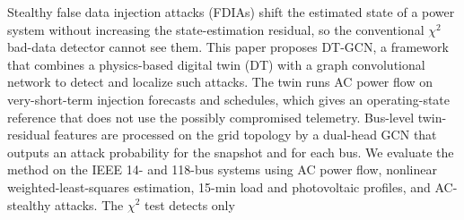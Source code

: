 Stealthy false data injection attacks (FDIAs) shift the estimated state of a power system without increasing the state-estimation residual, so the conventional $\chi^2$ bad-data detector cannot see them. This paper proposes DT-GCN, a framework that combines a physics-based digital twin (DT) with a graph convolutional network to detect and localize such attacks. The twin runs AC power flow on very-short-term injection forecasts and schedules, which gives an operating-state reference that does not use the possibly compromised telemetry. Bus-level twin-residual features are processed on the grid topology by a dual-head GCN that outputs an attack probability for the snapshot and for each bus. We evaluate the method on the IEEE 14- and 118-bus systems using AC power flow, nonlinear weighted-least-squares estimation, 15-min load and photovoltaic profiles, and AC-stealthy attacks. The $\chi^2$ test detects only %
